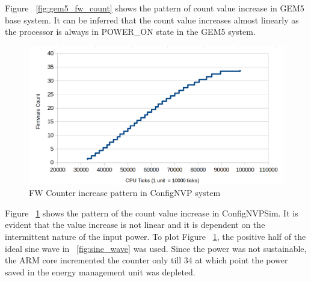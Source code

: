 \documentclass[conference]{IEEEtran}
\begin{document}
Figure ~\ref{fig:gem5_fw_count} shows the pattern of count value increase in GEM5 base system. It can be inferred that the count value increases almost linearly as the processor is always in POWER\_ON state in the GEM5 system. 

\begin{figure}[htbp]
\centerline{\includegraphics[scale=0.2]{nvpsim_fw_count.png}}
\caption{FW Counter increase pattern in ConfigNVP system}
\label{fig:nvpsim_fw_count}
\end{figure}
Figure ~\ref{fig:nvpsim_fw_count} shows the pattern of the count value increase in ConfigNVPSim. It is evident that the value increase is not linear and it is dependent on the intermittent nature of the input power. To plot Figure ~\ref{fig:nvpsim_fw_count}, the positive half of the ideal sine wave in ~\ref{fig:sine_wave} was used. Since the power was not sustainable, the ARM core incremented the counter only till 34 at which point the power saved in the energy management unit was depleted. 
\end{document}
